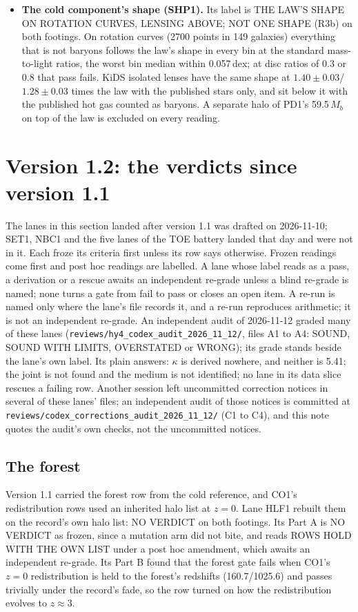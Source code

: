 \documentclass[10pt]{article}
\begin{document}
\begin{itemize}
\item \textbf{The cold component's shape (SHP1).} Its label is THE LAW'S SHAPE ON ROTATION CURVES, LENSING ABOVE; NOT ONE SHAPE (R3b) on both footings. On rotation curves (2700 points in 149 galaxies) everything that is not baryons follows the law's shape in every bin at the standard mass-to-light ratios, the worst bin median within 0.057\,dex; at disc ratios of 0.3 or 0.8 that pass fails. KiDS isolated lenses have the same shape at $1.40\pm0.03$/$1.28\pm0.03$ times the law with the published stars only, and sit below it with the published hot gas counted as baryons. A separate halo of PD1's 59.5\,$M_b$ on top of the law is excluded on every reading.
\end{itemize}

\section{Version 1.2: the verdicts since version 1.1}
The lanes in this section landed after version 1.1 was drafted on 2026-11-10; SET1, NBC1 and the five lanes of the TOE battery landed that day and were not in it. Each froze its criteria first unless its row says otherwise. Frozen readings come first and post hoc readings are labelled. A lane whose label reads as a pass, a derivation or a rescue awaits an independent re-grade unless a blind re-grade is named; none turns a gate from fail to pass or closes an open item. A re-run is named only where the lane's file records it, and a re-run reproduces arithmetic; it is not an independent re-grade. An independent audit of 2026-11-12 graded many of these lanes (\texttt{reviews/hy4\_codex\_audit\_2026\_11\_12/}, files A1 to A4: SOUND, SOUND WITH LIMITS, OVERSTATED or WRONG); its grade stands beside the lane's own label. Its plain answers: $\kappa$ is derived nowhere, and neither is 5.41; the joint is not found and the medium is not identified; no lane in its data slice rescues a failing row. Another session left uncommitted correction notices in several of these lanes' files; an independent audit of those notices is committed at \texttt{reviews/codex\_corrections\_audit\_2026\_11\_12/} (C1 to C4), and this note quotes the audit's own checks, not the uncommitted notices.

\subsection{The forest}
Version 1.1 carried the forest row from the cold reference, and CO1's redistribution rows used an inherited halo list at $z=0$. Lane HLF1 rebuilt them on the record's own halo list: NO VERDICT on both footings. Its Part A is NO VERDICT as frozen, since a mutation arm did not bite, and reads ROWS HOLD WITH THE OWN LIST under a post hoc amendment, which awaits an independent re-grade. Its Part B found that the forest gate fails when CO1's $z=0$ redistribution is held to the forest's redshifts (160.7/1025.6) and passes trivially under the record's fade, so the row turned on how the redistribution evolves to $z\approx3$.
\end{document}
